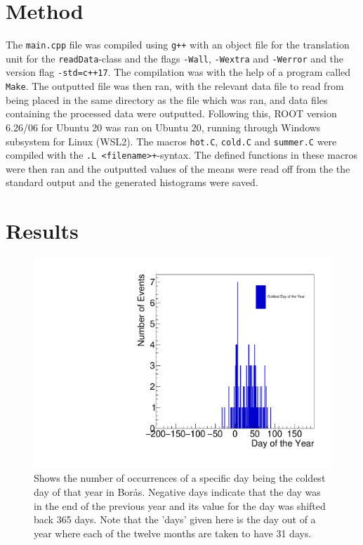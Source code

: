 \documentclass[a4, 12pt]{article}
\begin{document}
\section{Method}
The \texttt{main.cpp} file was compiled using \texttt{g++} with an object file for the translation unit for the \texttt{readData}-class and the flags \texttt{-Wall}, \texttt{-Wextra} and \texttt{-Werror} and the version flag \texttt{-std=c++17}. The compilation was with the help of a program called \texttt{Make}. The outputted file was then ran, with the relevant data file to read from being placed in the same directory as the file which was ran, and data files containing the processed data were outputted. Following this, ROOT version 6.26/06 for Ubuntu 20 was ran on Ubuntu 20, running through Windows subsystem for Linux (WSL2). The macros \texttt{hot.C}, \texttt{cold.C} and \texttt{summer.C} were compiled with the \texttt{.L <filename>+}-syntax. The defined functions in these macros were then ran and the outputted values of the means were read off from the the standard output and the generated histograms were saved.



\section{Results}


\begin{figure}[H]
\centering
\includegraphics[scale=0.50]{philipCold.pdf}
\caption{Shows the number of occurrences of a specific day being the coldest day of that year in Borås. Negative days indicate that the day was in the end of the previous year and its value for the day was shifted back 365 days. Note that the 'days' given here is the day out of a year where each of the twelve months are taken to have 31 days.}
\end{figure}
\end{document}
